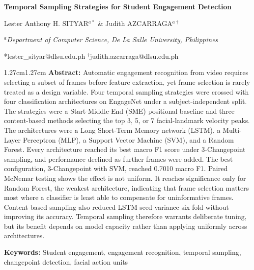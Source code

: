 \documentclass[11pt,a4paper]{article}
\begin{document}
\thispagestyle{iccefirst}
\justifying

\begin{center}
{\fontsize{22}{26}\selectfont\bfseries Temporal Sampling Strategies for Student Engagement Detection}

\vspace{0.35cm}

{\large Lester Anthony H. SITYAR$^{a*}$ \& Judith AZCARRAGA$^{a\dagger}$}

\vspace{0.2cm}

{\itshape $^{a}$Department of Computer Science, De La Salle University, Philippines}

\vspace{0.15cm}

*lester\_sityar@dlsu.edu.ph \quad $^{\dagger}$judith.azcarraga@dlsu.edu.ph

\end{center}

\vspace{0.3cm}

\begin{adjustwidth}{1.27cm}{1.27cm}
\fontsize{10}{12}\selectfont
\noindent\textbf{Abstract:} Automatic engagement recognition from video requires selecting a subset of frames before feature extraction, yet frame selection is rarely treated as a design variable. Four temporal sampling strategies were crossed with four classification architectures on EngageNet under a subject-independent split. The strategies were a Start-Middle-End (SME) positional baseline and three content-based methods selecting the top 3, 5, or 7 facial-landmark velocity peaks. The architectures were a Long Short-Term Memory network (LSTM), a Multi-Layer Perceptron (MLP), a Support Vector Machine (SVM), and a Random Forest. Every architecture reached its best macro F1 score under 3-Changepoint sampling, and performance declined as further frames were added. The best configuration, 3-Changepoint with SVM, reached 0.7010 macro F1. Paired McNemar testing shows the effect is not uniform. It reaches significance only for Random Forest, the weakest architecture, indicating that frame selection matters most where a classifier is least able to compensate for uninformative frames. Content-based sampling also reduced LSTM seed variance six-fold without improving its accuracy. Temporal sampling therefore warrants deliberate tuning, but its benefit depends on model capacity rather than applying uniformly across architectures.

\vspace{0.2cm}
\noindent\textbf{Keywords:} Student engagement, engagement recognition, temporal sampling, changepoint detection, facial action units
\end{adjustwidth}
\end{document}
